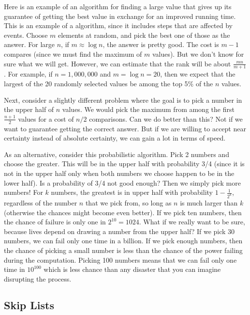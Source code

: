 Here is an example of an algorithm for finding a large value that
gives up its guarantee of getting the best value in exchange for an
improved running time.
This is an example of a  algorithm, since it
includes steps that are affected by  events.
Choose $m$ elements at random, and pick the best one of those as the
answer.
For large $n$, if $m \approx \log n$, the answer is pretty good.
The cost is $m-1$ compares (since we must find the maximum of $m$
values).
But we don't know for sure what we will get.
However, we can estimate that the rank will be about
\(\frac{mn}{m+1}\).
For example, if \(n = 1,000,000\) and \(m = \log n = 20\),
then we expect that the largest of the 20 randomly selected values be
among the top 5\% of the \(n\) values.

Next, consider a slightly different problem where the goal is to
pick a number in the upper half of $n$ values.
We would pick the maximum from among the first $\frac{n+1}{2}$ values
for a cost of $n/2$ comparisons.
Can we do better than this?
Not if we want to guarantee getting the correct answer.
But if we are willing to accept near certainty instead of absolute
certainty, we can gain a lot in terms of speed.

As an alternative, consider this probabilistic algorithm.
Pick 2 numbers and choose the greater.
This will be in the upper half with probability 3/4 (since it is not
in the upper half only when both numbers we choose happen to be in the
lower half).
Is a probability of 3/4 not good enough?
Then we simply pick more numbers!
For $k$ numbers, the greatest is in upper half with probability
$1 - \frac{1}{2^k}$, regardless of the number $n$ that we pick from,
so long as $n$ is much larger than $k$ (otherwise the chances might
become even better).
If we pick ten numbers, then the chance of failure is only one in
$2^{10} = 1024$.
What if we really want to be sure, because lives depend on drawing a
number from the upper half?
If we pick 30 numbers, we can fail only one time in a billion.
If we pick enough numbers, then the chance of picking a small
number is less than the chance of the power failing during the
computation.
Picking 100 numbers means that we can fail only one time in $10^{100}$
which is less chance than any disaster that you can imagine
disrupting the process.

\subsection{Skip Lists}
\label{SkipListSec}

